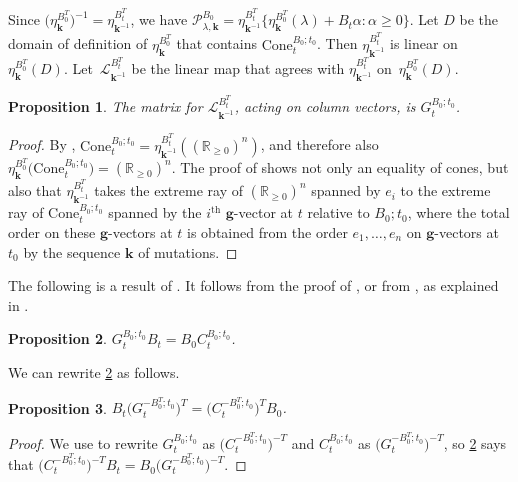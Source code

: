 \documentclass{amsart}
\newtheorem{proposition}{Proposition}[section]
\theoremstyle{definition}
\theoremstyle{remark}
\numberwithin{equation}{section}
\newcommand{\reals}{\mathbb R}
\newcommand{\sett}[1]{{\bigl\lbrace #1 \bigr\rbrace}}
\renewcommand{\th}{^\text{th}}
\newcommand{\0}{{\mathbf{0}}}
\newcommand{\Cone}{\mathrm{Cone}}
\newcommand{\g}{\mathbf{g}}
\newcommand{\kk}{\mathbf{k}}
\renewcommand{\L}{\mathcal{L}}
\renewcommand{\P}{\mathcal{P}}
\renewcommand{\th}{^\text{th}}
\begin{document}
Since $\bigl(\eta_{\kk}^{B_0^T}\bigr)^{-1}=\eta_{\kk^{-1}}^{B_t^T}$, we have $\P^{B_0}_{\lambda,\kk}=\eta_{\kk^{-1}}^{B_t^T}\sett{\eta_\kk^{B_0^T}(\lambda)+B_t\alpha:\alpha\ge0}$.
Let $D$ be the domain of definition of $\eta_{\kk}^{B_0^T}$  that contains $\Cone^{B_0;t_0}_t$.
Then $\eta_{\kk^{-1}}^{B_t^T}$ is linear on $\eta_{\kk}^{B_0^T}(D)$.
Let~$\L_{\kk^{-1}}^{B_t^T}$ be the linear map that agrees with $\eta_{\kk^{-1}}^{B_t^T}$ on~$\eta_{\kk}^{B_0^T}(D)$.

\begin{proposition}\label{L mat}
The matrix for $\L_{\kk^{-1}}^{B_t^T}$, acting on column vectors, is $G_t^{B_0;t_0}$.
\end{proposition}
\begin{proof}
By \cite[Proposition~8.13]{universal}, $\Cone^{B_0;t_0}_t=\eta_{\kk^{-1}}^{B_t^T}\left(\left(\reals_{\ge0}\right)^n\right)$, and therefore also ${\eta_\kk^{B_0^T}\bigl(\Cone^{B_0;t_0}_t\bigr)=\left(\reals_{\ge0}\right)^n}$.
The proof of \cite[Proposition~8.13]{universal} shows not only an equality of cones, but also that $\eta_{\kk^{-1}}^{B_t^T}$ takes the extreme ray of $\left(\reals_{\ge0}\right)^n$ spanned by $e_i$ to the extreme ray of $\Cone^{B_0;t_0}_t$ spanned by the $i\th$ $\g$-vector at $t$ relative to $B_0;t_0$, where the total order on these $\g$-vectors at $t$ is obtained from the order $e_1,\ldots,e_n$ on $\g$-vectors at $t_0$ by the sequence $\kk$ of mutations.
\end{proof}

The following is a result of \cite{NZ12}.
It follows from the proof of \cite[Proposition~1.3]{NZ12}, or from \cite[(6.14)]{FZ07}, as explained in \cite[Remark~2.1]{NZ12}.

\begin{proposition}\label{GBBC}
$G_t^{B_0;t_0}B_t=B_0C_t^{B_0;t_0}$.
\end{proposition}

We can rewrite \cref{GBBC} as follows.

\begin{proposition}\label{BGCB}
$B_t\bigl(G_t^{-B_0^T;t_0}\bigr)^T=\bigl(C_t^{-B_0^T;t_0}\bigr)^TB_0$.
\end{proposition}
\begin{proof}
We use \cite[Theorem~1.2]{NZ} to rewrite $G_t^{B_0;t_0}$ as $\bigl(C_t^{-B_0^T;t_0}\bigr)^{-T}$ and $C_t^{B_0;t_0}$ as $\bigl(G_t^{-B_0^T;t_0}\bigr)^{-T}$, so \cref{GBBC} says that $\bigl(C_t^{-B_0^T;t_0}\bigr)^{-T}B_t=B_0\bigl(G_t^{-B_0^T;t_0}\bigr)^{-T}$.
\end{proof}
\end{document}
